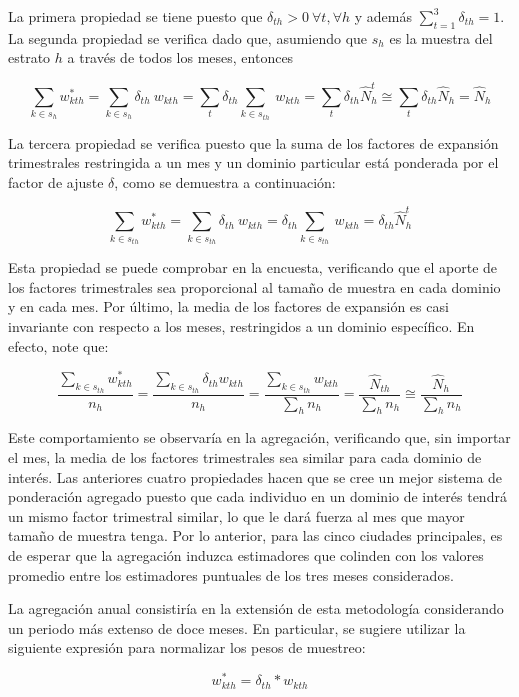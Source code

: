 \documentclass[
  10pt,
  spanish,
]{book}
\begin{document}
La primera propiedad se tiene puesto que
\(\delta_{th} > 0 \ \forall t, \forall h\) y además
\(\sum_{t=1}^3 \delta_{th} = 1\). La segunda propiedad se verifica dado
que, asumiendo que \(s_{h}\) es la muestra del estrato \(h\) a través de
todos los meses, entonces

\[
\sum_{k\in s_{h}} w_{kth}^{*}=\sum_{k\in s_h}\delta_{th}\ w_{kth}
=\sum_{t}\delta_{th}\sum_{k\in s_{th}}\ w_{kth} 
=\sum_{t}\delta_{th}\hat{N}_h^t \cong \sum_{t}\delta_{th}\hat{N}_h = \hat{N}_h
\]

La tercera propiedad se verifica puesto que la suma de los factores de
expansión trimestrales restringida a un mes y un dominio particular está
ponderada por el factor de ajuste \(\delta\), como se demuestra a
continuación:

\[
\sum_{k\in s_{th}} w_{kth}^{*}=\sum_{k\in s_{th}}\delta_{th}\ w_{kth}
=\delta_{th}\sum_{k\in s_{th}}\ w_{kth} 
=\delta_{th}\hat{N}_h^t
\]

Esta propiedad se puede comprobar en la encuesta, verificando que el aporte de los factores trimestrales sea proporcional al tamaño de muestra en cada dominio y en cada mes. Por último, la media de los factores de expansión es casi invariante con
respecto a los meses, restringidos a un dominio específico. En efecto,
note que:

\[
\frac{\sum_{k\in s_{th}} w_{kth}^{*}}{n_{h}}
=\frac{\sum_{k\in s_{th}} \delta_{th}w_{kth}}{n_{h}}
=\frac{\sum_{k\in s_{th}} w_{kth}}{\sum_h n_h}
=\frac{\hat{N}_{th}}{\sum_h n_h}
\cong \frac{\hat{N}_{h}}{\sum_h n_h}
\]

Este comportamiento se observaría en la agregación, verificando que, sin importar el mes, la media de los factores trimestrales sea similar para cada dominio de interés. Las anteriores cuatro propiedades hacen que se cree un mejor sistema de
ponderación agregado puesto que cada individuo en un dominio de interés
tendrá un mismo factor trimestral similar, lo que le dará fuerza al mes
que mayor tamaño de muestra tenga. Por lo anterior, para las cinco
ciudades principales, es de esperar que la agregación induzca
estimadores que colinden con los valores promedio entre los estimadores
puntuales de los tres meses considerados.

La agregación anual consistiría en la extensión de esta metodología
considerando un periodo más extenso de doce meses. En particular, se sugiere utilizar la siguiente expresión para normalizar los pesos de muestreo:

\[
w_{kth}^{*}=\delta_{th}*w_{kth}
\]
\end{document}
